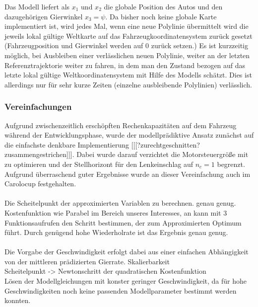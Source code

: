 Das Modell liefert als $x_1$ und $x_2$ die globale Position des Autos und den dazugehörigen Gierwinkel $x_3=\psi$. Da bisher noch keine globale Karte implementiert ist, wird jedes Mal, wenn eine neue Polylinie übermittelt wird die jeweils lokal gültige Weltkarte auf das Fahrzeugkoordinatensystem zurück gesetzt (Fahrzeugposition und Gierwinkel werden auf 0 zurück setzen.) Es ist kurzzeitig möglich, bei Ausbleiben einer verlässlichen neuen Polylinie, weiter an der letzten Referenztrajektorie weiter zu fahren, in dem man den Zustand bezogen auf das letzte lokal gültige Weltkoordinatensystem mit Hilfe des Modells schätzt. Dies ist allerdings nur für sehr kurze Zeiten (einzelne ausbleibende Polylinien) verlässlich.
\subsubsection{Vereinfachungen}
Aufgrund zwischenzeitlich erschöpften Rechenkapazitäten auf dem Fahrzeug während der Entwicklungsphase, wurde der modellprädiktive Ansatz zunächst auf die einfachste denkbare Implementierung [[[?zurechtgeschnitten? zusammengestrichen]]]. Dabei wurde darauf verzichtet die Motorsteuergröße mit zu optimieren und der Stellhorizont für den Lenkeinschlag auf $n_c=1$ begrenzt. Aufgrund überraschend guter Ergebnisse wurde an dieser Vereinfachung auch im Carolocup festgehalten.\\ \\
Die Scheitelpunkt der approximierten Variablen zu berechnen. genau genug.\\
Kostenfunktion wie Parabel im Bereich unseres Interesses, an kann mit 3 Funktionsaufrufen den Schritt bestimmen, der zum Approximierten Optimum führt. Durch genügend hohe Wiederholrate ist das Ergebnis genau genug.\\ \\
Die Vorgabe der Geschwindigkeit erfolgt dabei aus einer einfachen Abhängigkeit von der mittleren prädizierten Gierrate. 
Skalierbarkeit\\
Scheitelpunkt -> Newtonschritt der quadratischen Kostenfunktion\\

Lösen der Modellgleichungen mit konster geringer Geschwindigkeit, da für hohe Geschwindigkeiten noch keine passenden Modellparameter bestimmt werden konnten.
